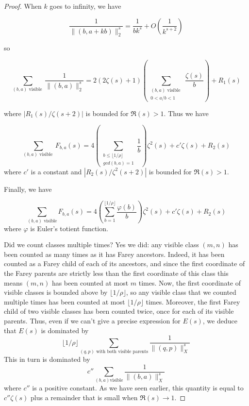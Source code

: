 \documentclass{article}
\theoremstyle{definition}
\begin{document}
\begin{proof}
When $k$ goes to infinity, we have 

$$\frac{1}{\|(b,a+kb)\|_2^s } = \frac{1}{bk^s} + O\left ( \frac{1}{k^{s+2}} \right )$$

so 

$$ \sum_{(b,a) \text{ visible }}  \frac{1}{\|(b,a)\|_2^s } = 2(2\zeta(s) +1) \left (\sum_{\substack{(b,a) \text{ visible } \\ 0<a/b<1}} \frac{\zeta(s)}{b} \right ) + R_1(s)$$

where $|R_1(s)/\zeta(s+2)|$ is bounded for $\Re(s) >1$. Thus we have

$$ \sum_{(b,a) \text{ visible }} F_{b,a}(s) = 4 \left ( \sum_{\substack{ b \le \lfloor 1/\rho \rfloor \\ gcd(b,a)=1}} \frac{1}{b} \right ) \zeta^2(s) + c' \zeta(s) + R_2(s) $$
where $c'$ is a constant and $|R_2(s) / \zeta^2(s+2)|$ is bounded for $\Re(s)>1$.

Finally, we have 

$$ \sum_{(b,a) \text{ visible}} F_{b,a}(s) = 4 \left ( \sum_{b=1}^{\lfloor 1/\rho \rfloor}\frac{\varphi(b)}{b} \right ) \zeta^2(s) + c' \zeta(s) + R_2(s) $$ 
where $\varphi$ is Euler's totient function. \newline 


Did we count classes multiple times? Yes we did: any visible class $(m,n)$ has been counted as many times as it has Farey ancestors. Indeed, it has been counted as a Farey child of each of its ancestors, and since the first coordinate of the Farey parents are strictly less than the first coordinate of this class this means $(m,n)$ has been counted at most $m$ times. Now, the first coordinate of visible classes is bounded above by $\lfloor 1/\rho \rfloor$, so any visible class that we counted multiple times has been counted at most $\lfloor 1/\rho \rfloor$ times. Moreover, the first Farey child of two visible classes has been counted twice, once for each of its visible parents. 
Thus, even if we can't give a precise expression for $E(s)$, we deduce that $E(s)$ is dominated by 
$$\lfloor 1/\rho \rfloor \sum\limits_{(q,p) \text{ with both visible parents}} \frac{1}{\| (q,p) \|_X^s}$$
This in turn is dominated by 
$$ c'' \sum\limits_{(b,a) \text{visible}} \frac{1}{\| (b,a) \|_X^s} $$
where $c''$ is a positive constant. As we have seen earlier, this quantity is equal to $c''\zeta(s)$ plus a remainder that is small when $\Re(s)\longrightarrow 1$.
\newline \newline


\end{proof}
\end{document}
